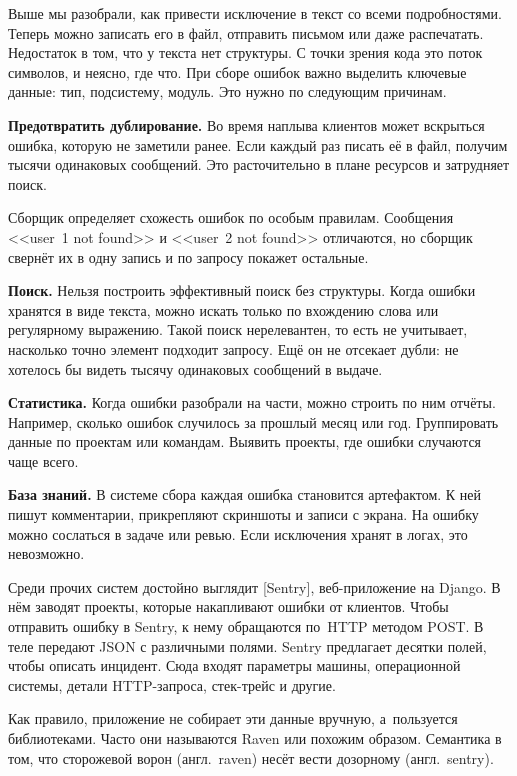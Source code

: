 Выше мы разобрали, как привести исключение в текст со всеми
подробностями. Теперь можно записать его в файл, отправить письмом или даже
распечатать. Недостаток в том, что у текста нет структуры. С точки зрения кода
это поток символов, и неясно, где что. При сборе ошибок важно выделить ключевые
данные: тип, подсистему, модуль. Это нужно по следующим причинам.

\textbf{Предотвратить дублирование.} Во время наплыва клиентов может вскрыться
ошибка, которую не заметили ранее. Если каждый раз писать её в файл, получим
тысячи одинаковых сообщений. Это расточительно в плане ресурсов и затрудняет
поиск.

Сборщик определяет схожесть ошибок по особым правилам. Сообщения <<user~1 not
found>> и <<user~2 not found>> отличаются, но сборщик свернёт их в одну запись и
по запросу покажет остальные.

\textbf{Поиск.} Нельзя построить эффективный поиск без структуры. Когда ошибки
хранятся в виде текста, можно искать только по вхождению слова или регулярному
выражению. Такой поиск нерелевантен, то есть не учитывает, насколько точно
элемент подходит запросу. Ещё он не отсекает дубли: не хотелось бы видеть тысячу
одинаковых сообщений в выдаче.

\textbf{Статистика.} Когда ошибки разобрали на части, можно строить по ним
отчёты. Например, сколько ошибок случилось за прошлый месяц или
год. Группировать данные по проектам или командам. Выявить проекты, где ошибки
случаются чаще всего.

\textbf{База знаний.} В системе сбора каждая ошибка становится артефактом. К ней
пишут комментарии, прикрепляют скриншоты и записи с экрана. На ошибку можно
сослаться в задаче или ревью. Если исключения хранят в логах, это невозможно.


Среди прочих систем достойно выглядит [Sentry],
веб-при\-ло\-же\-ние на Django. В нём заводят проекты, которые накапливают ошибки
от клиентов. Чтобы отправить ошибку в Sentry, к нему обращаются по~HTTP методом
POST. В теле передают JSON с различными полями. Sentry предлагает десятки полей,
чтобы описать инцидент. Сюда входят параметры машины, операционной системы, детали
HTTP-запроса, стек-трейс и другие.


Как правило, приложение не собирает эти данные вручную, а~пользуется
библиотеками. Часто они называются Raven или похожим образом. Семантика в том,
что сторожевой ворон (англ.~raven) несёт вести дозорному (англ.~sentry).

